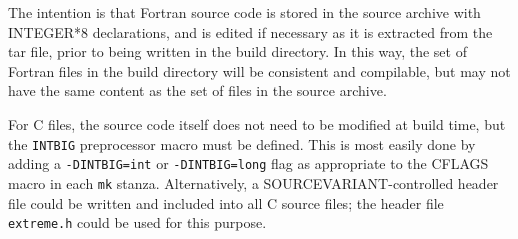 \documentclass[twoside,11pt]{article}
\renewcommand{\_}{\texttt{\symbol{95}}}
\newcommand{\file}[1]{{\tt #1}}
\newcommand{\cc}[1]{{\tt #1}}
\begin{document}
The intention is that Fortran source code is stored in the source 
archive with INTEGER*8 declarations,
and is edited if necessary 
as it is extracted from the tar file, prior to being
written in the build directory.
In this way, the set of Fortran files in the build directory 
will be consistent and compilable, 
but may not have the same content as the set of files in the source archive.

For C files, the source code itself does not need to be modified at
build time, but the \cc{INT\_BIG} preprocessor macro must be defined.
This is most easily done by adding a \cc{-DINT\_BIG=int} or 
\cc{-DINT\_BIG=long} flag as appropriate to the
CFLAGS macro in each \file{mk} stanza.
Alternatively, a SOURCE\_VARIANT-controlled header file could be
written and included into all C source files;
the header file \file{extreme.h} could be used
for this purpose.
\end{document}
